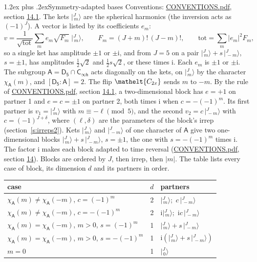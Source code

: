 \documentclass[10pt,a4paper]{article}
\makeatletter
\renewcommand\section{\@startsection{section}{1}{\z@}{-3ex plus -1ex minus -.2ex}%
  {1.2ex plus .2ex}{\normalfont\large\sffamily\bfseries\color{parttitle}}}
\numberwithin{equation}{section}
\newcommand{\eltfont}[1]{{\let\sigma\eltsigma\mathelt{#1}}}
\newcommand{\grp}[1]{\mathsf{#1}}
\newcommand{\elt}[1]{\eltfont{#1}}
\newcommand{\grpindex}[2]{[#1 : #2]}
\newcommand{\iunit}{\mathrm{i}}
\newcommand{\chiA}{\chi_{\grp{A}}}
\newcommand{\jm}[2]{\bigl\lvert{}^{#1}_{\,#2}\bigr\rangle}
\makeatother
\begin{document}
\section{Symmetry-adapted bases}\label{s:bases}
Conventions: \href{../../CONVENTIONS.pdf}{CONVENTIONS.pdf}, section \href{../../CONVENTIONS.pdf\#conv.14.1}{14.1}.
\leavevmode\label{n:index.m}\label{n:vector.ket}The kets $\jm{J}{m}$ are the spherical harmonics (the inversion acts as $(-1)^J$). \label{n:index.ketcoefficient}\label{n:vector.basis.symmetry}\label{n:index.ketweight}\label{n:index.total}A vector is listed by its coefficients $e_m$:
\begin{equation}\label{e:ket}v = \frac{1}{\sqrt{\mathrm{tot}}}\sum_m e_m\sqrt{F_m}\;\jm{J}{m},\qquad F_m = (J+m)!\,(J-m)!,\qquad \mathrm{tot} = \sum_m |e_m|^2F_m,\end{equation}
\leavevmode\label{n:index.pair.sign}so a single ket has amplitude $\pm1$ or $\pm\iunit$, and from $J = 5$ on a pair $\jm{J}{m} + s\,\jm{J}{-m}$, $s = \pm1$, has amplitudes $\tfrac{1}{2}\sqrt{2}$ and $\tfrac{1}{2}s\sqrt{2}$, or these times $\iunit$. Each $e_m$ is $\pm1$ or $\pm\iunit$.
\leavevmode\label{n:group.A}\label{n:function.character.abelian}The subgroup $\grp{A} = \grp{D_{5}}\cap\grp{C_{\infty h}}$ acts diagonally on the kets, on $\jm{J}{m}$ by the character $\chiA(m)$, and $\grpindex{\grp{D_{5}}}{\grp{A}} = 2$. The flip $\elt{C_{2x}}$ sends $m$ to $-m$. \label{n:index.partner.sign}By the rule of \href{../../CONVENTIONS.pdf}{CONVENTIONS.pdf}, section \href{../../CONVENTIONS.pdf\#conv.14.1}{14.1}, a two-dimensional block has $e = +1$ on partner 1 and $e = c = \pm1$ on partner 2, both times $\iunit$ when $c = -(-1)^m$. Its first partner is $v_1 = \jm{J}{m}$ with $m \equiv -\ell \pmod{5}$, and the second $v_2 = c\,\jm{J}{-m}$ with $c = (-1)^{J+\delta}$, where $(\ell, \delta)$ are the parameters of the block's irrep (section~\ref{s:irreps2}). Kets $\jm{J}{m}$ and $\jm{J}{-m}$ of one character of $\grp{A}$ give two one-dimensional blocks $\jm{J}{m} + s\,\jm{J}{-m}$, $s = \pm1$, the one with $s = -(-1)^m$ times $\iunit$. The factor $\iunit$ makes each block adapted to time reversal (\href{../../CONVENTIONS.pdf}{CONVENTIONS.pdf}, section \href{../../CONVENTIONS.pdf\#conv.14}{14}). Blocks are ordered by $J$, then irrep, then $|m|$.
\leavevmode\label{n:head.case}\label{n:head.partners}The table lists every case of block, its dimension $d$ and its partners in order.
\begin{center}\begin{tabular}{@{}lrl@{}}\toprule
case & $d$ & partners\\\midrule
$\chiA(m) \ne \chiA(-m)$, $c = (-1)^m$ & 2 & $\jm{J}{m}$;\ $c\,\jm{J}{-m}$\\
$\chiA(m) \ne \chiA(-m)$, $c = -(-1)^m$ & 2 & $\iunit\jm{J}{m}$;\ $\iunit c\,\jm{J}{-m}$\\
$\chiA(m) = \chiA(-m)$, $m > 0$, $s = (-1)^m$ & 1 & $\jm{J}{m} + s\,\jm{J}{-m}$\\
$\chiA(m) = \chiA(-m)$, $m > 0$, $s = -(-1)^m$ & 1 & $\iunit(\jm{J}{m} + s\,\jm{J}{-m})$\\
$m = 0$ & 1 & $\jm{J}{0}$\\
\bottomrule\end{tabular}\end{center}
\end{document}

